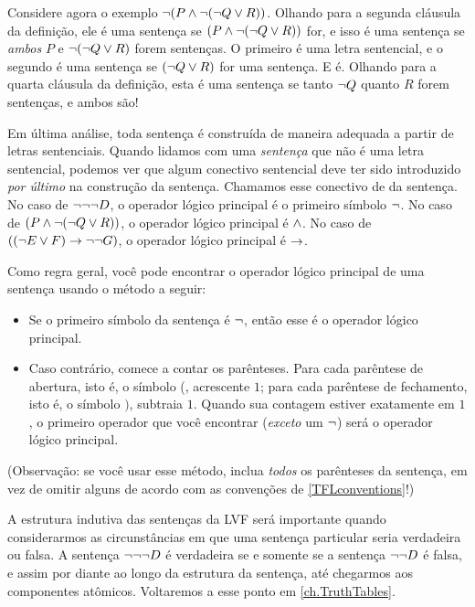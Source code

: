 Considere agora o exemplo $\neg (P \wedge \neg (\neg Q \vee R))$.
Olhando para a segunda cláusula da definição, ele é uma sentença se
$(P \wedge \neg (\neg Q \vee R))$ for, e isso é uma sentença se
\emph{ambos} $P$ e $\neg (\neg Q \vee R)$ forem sentenças. O primeiro
é uma letra sentencial, e o segundo é uma sentença se
$(\neg Q \vee R)$ for uma sentença. E é. Olhando para a quarta cláusula
da definição, esta é uma sentença se tanto $\neg Q$ quanto $R$ forem
sentenças, e ambos são!

Em última análise, toda sentença é construída de maneira adequada a
partir de letras sentenciais. Quando lidamos com uma \emph{sentença} que
não é uma letra sentencial, podemos ver que algum conectivo sentencial
deve ter sido introduzido \emph{por último} na construção da sentença.
Chamamos esse conectivo de  da
sentença. No caso de $\neg\neg\neg D$, o operador lógico principal é
o primeiro símbolo $\neg$. No caso de
$(P \wedge \neg (\neg Q \vee R))$, o operador lógico principal é
$\wedge$. No caso de $((\neg E \vee F) \rightarrow \neg\neg G)$, o operador
lógico principal é $\rightarrow$.

Como regra geral, você pode encontrar o operador lógico principal de uma
sentença usando o método a seguir:
\begin{itemize}
	\item Se o primeiro símbolo da sentença é $\neg$, então esse é o operador lógico principal.
	\item Caso contrário, comece a contar os parênteses. Para cada parêntese de abertura, isto é, o símbolo (, acrescente $1$; para cada parêntese de fechamento, isto é, o símbolo $)$, subtraia $1$. Quando sua contagem estiver exatamente em $1$, o primeiro operador que você encontrar (\emph{exceto} um $\neg$) será o operador lógico principal.
\end{itemize}

(Observação: se você usar esse método, inclua \emph{todos} os parênteses
da sentença, em vez de omitir alguns de acordo com as convenções de
\cref{TFLconventions}!)

A estrutura indutiva das sentenças da LVF será importante quando
considerarmos as circunstâncias em que uma sentença particular seria
verdadeira ou falsa. A sentença $\neg \neg \neg D$ é verdadeira se e
somente se a sentença $\neg \neg D$ é falsa, e assim por diante ao longo
da estrutura da sentença, até chegarmos aos componentes atômicos.
Voltaremos a esse ponto em \cref{ch.TruthTables}.

